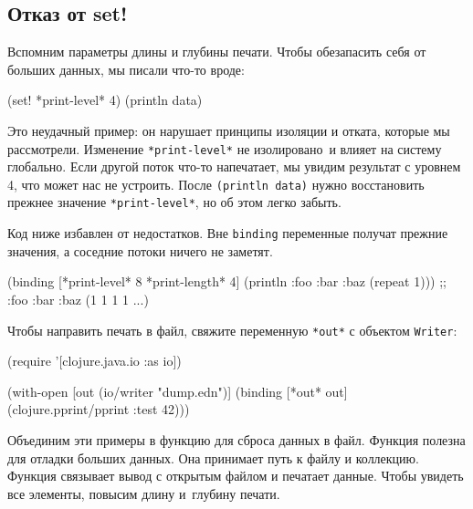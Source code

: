 \subsection{Отказ от set!}

Вспомним параметры длины и глубины печати. Чтобы обезапасить себя от больших
данных, мы писали что-то вроде:

\begin{english}
  \begin{clojure}
(set! *print-level* 4)
(println data)
  \end{clojure}
\end{english}


Это неудачный пример: он нарушает принципы изоляции и отката, которые мы
рассмотрели. Изменение \verb|*print-level*| не изолировано~и влияет на систему
глобально. Если другой поток что-то напечатает, мы увидим результат с уровнем 4,
что может нас не устроить. После \verb|(println data)| нужно восстановить
прежнее значение \verb|*print-level*|, но об этом легко забыть.

Код ниже избавлен от недостатков. Вне \verb|binding| переменные получат
прежние значения, а соседние потоки ничего не заметят.

\begin{english}
  \begin{clojure}
(binding [*print-level* 8
          *print-length* 4]
  (println {:foo {:bar {:baz (repeat 1)}}}))
;; {:foo {:bar {:baz (1 1 1 1 ...)}}}
  \end{clojure}
\end{english}


Чтобы направить печать в файл, свяжите переменную \verb|*out*| с объектом
\verb|Writer|:

\begin{english}
  \begin{clojure}
(require '[clojure.java.io :as io])

(with-open [out (io/writer "dump.edn")]
  (binding [*out* out]
    (clojure.pprint/pprint {:test 42})))
  \end{clojure}
\end{english}

Объединим эти примеры в функцию для сброса данных в файл. Функция полезна для
отладки больших данных. Она принимает путь к файлу и коллекцию. Функция
связывает вывод с открытым файлом и печатает данные. Чтобы увидеть все элементы,
повысим длину и~глубину печати.

